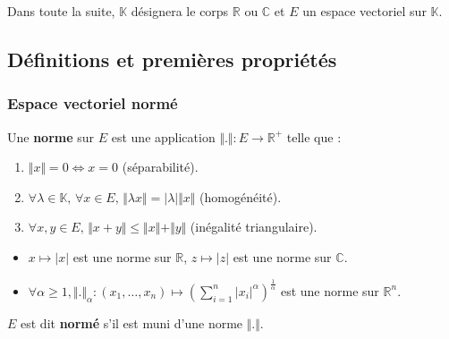 




  Dans toute la suite, $\mathbb{K}$ désignera le corps $\mathbb{R}$ ou $\mathbb{C}$ et $E$ un espace vectoriel sur $\mathbb{K}$.

  \subsection{Définitions et premières propriétés}

  \subsubsection{Espace vectoriel normé}


  \begin{definition}
    Une \textbf{norme} sur $E$ est une application $\Vert . \Vert : E \rightarrow \mathbb{R}^+$ telle que :
    \begin{enumerate}[label=(\roman*)]
      \item $\Vert x \Vert = 0 \iff x = 0$ (séparabilité).
      \item $\forall \lambda \in \mathbb{K}, \, \forall x \in E, \, \Vert \lambda x \Vert = \vert \lambda \vert \Vert x \Vert$ (homogénéité).
      \item $\forall x, y \in E, \, \Vert x + y \Vert \leq \Vert x \Vert + \Vert y \Vert$ (inégalité triangulaire).
    \end{enumerate}
  \end{definition}

  \begin{example}
    \label{208-1}
    \begin{itemize}
      \item $x \mapsto \vert x \vert$ est une norme sur $\mathbb{R}$, $z \mapsto \vert z \vert$ est une norme sur $\mathbb{C}$.
      \item $\forall \alpha \geq 1, \Vert . \Vert_\alpha : (x_1, \dots, x_n) \mapsto \left(\sum_{i=1}^n \vert x_i \vert^\alpha\right)^{\frac{1}{\alpha}}$ est une norme sur $\mathbb{R}^n$.
    \end{itemize}
  \end{example}


  \begin{definition}
    $E$ est dit \textbf{normé} s'il est muni d'une norme $\Vert . \Vert$.
  \end{definition}

